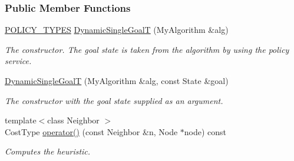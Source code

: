 \subsubsection*{Public Member Functions}
\begin{DoxyCompactItemize}
\item 
\hyperlink{extensions_2shared__policies_2headers_8h_ae70a06fa4631780beea14971eb36a562}{P\+O\+L\+I\+C\+Y\+\_\+\+T\+Y\+P\+ES} \hyperlink{structslb_1_1ext_1_1policy_1_1heuristic_1_1DynamicSingleGoalT_ab491e6a9a177935e45f3c0b93389a286}{Dynamic\+Single\+GoalT} (My\+Algorithm \&alg)
\begin{DoxyCompactList}\small\item\em The constructor. The goal state is taken from the algorithm by using the policy service. \end{DoxyCompactList}\item 
\hyperlink{structslb_1_1ext_1_1policy_1_1heuristic_1_1DynamicSingleGoalT_a97461ead765eae5d7f184641a832c9b1}{Dynamic\+Single\+GoalT} (My\+Algorithm \&alg, const State \&goal)
\begin{DoxyCompactList}\small\item\em The constructor with the goal state supplied as an argument. \end{DoxyCompactList}\item 
{\footnotesize template$<$class Neighbor $>$ }\\Cost\+Type \hyperlink{structslb_1_1ext_1_1policy_1_1heuristic_1_1DynamicSingleGoalT_ab2839e7036a9450c47aa91316afbaee1}{operator()} (const Neighbor \&n, Node $\ast$node) const 
\begin{DoxyCompactList}\small\item\em Computes the heuristic. \end{DoxyCompactList}\end{DoxyCompactItemize}
